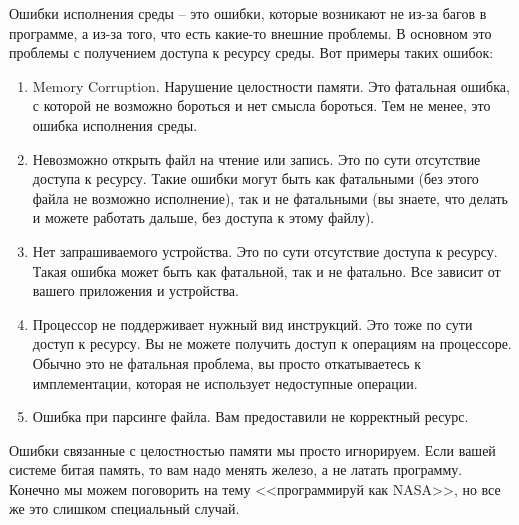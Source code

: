 Ошибки исполнения среды -- это ошибки, которые возникают не из-за багов в программе, а из-за того, что есть какие-то внешние проблемы.
В основном это проблемы с получением доступа к ресурсу среды.
Вот примеры таких ошибок:
\begin{enumerate}
\item Memory Corruption.
Нарушение целостности памяти.
Это фатальная ошибка, с которой не возможно бороться и нет смысла бороться.
Тем не менее, это ошибка исполнения среды.

\item Невозможно открыть файл на чтение или запись.
Это по сути отсутствие доступа к ресурсу.
Такие ошибки могут быть как фатальными (без этого файла не возможно исполнение), так и не фатальными (вы знаете, что делать и можете работать дальше, без доступа к этому файлу).

\item Нет запрашиваемого устройства.
Это по сути отсутствие доступа к ресурсу.
Такая ошибка может быть как фатальной, так и не фатально.
Все зависит от вашего приложения и устройства.

\item Процессор не поддерживает нужный вид инструкций.
Это тоже по сути доступ к ресурсу.
Вы не можете получить доступ к операциям на процессоре.
Обычно это не фатальная проблема, вы просто откатываетесь к имплементации, которая не использует недоступные операции.

\item Ошибка при парсинге файла.
Вам предоставили не корректный ресурс.
\end{enumerate}
Ошибки связанные с целостностью памяти мы просто игнорируем.
Если вашей системе битая память, то вам надо менять железо, а не латать программу.
Конечно мы можем поговорить на тему <<программируй как NASA>>, но все же это слишком специальный случай.

